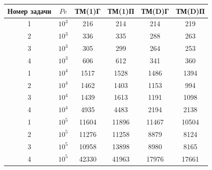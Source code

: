 {\hfill


{\begin{tabular}{|c|c|c|c|c|c|} 


\hline 


Номер задачи & $Pe$ & ТМ(1)Г & ТМ(1)П & ТМ(D)Г & ТМ(D)П\\ 


\hline 


1  &  $10^3$  &  216 &      214 &      214  &     219 \\ 


\hline 


2 &   $10^3$ &   336 &     335 &      288 &     263 \\ 


\hline 


3 &   $10^3$ &   305 &     299 &     264 &     253 \\ 


\hline 


4 &   $10^3$  &  606 &     612 &      341 &     360 \\ 


\hline 


1 &   $10^4$  &  1517 &    1528 &    1486 &    1394 \\ 


\hline 


2 &   $10^4$ &   1462 &    1403 &    1153 &   994 \\ 


\hline 


3 &   $10^4$ &   1439  &   1613  &   1191 &    1098 \\ 


\hline 


4 &   $10^4$ &   4935 &    4483 &    2194 &    2138 \\ 


\hline 


1 &   $10^5$ &   11604 &   11896  &  11467 &   10504 \\ 


\hline 


2 &   $10^5$ &   11276 &   11258 &   8879 &    8124 \\ 


\hline 


3 &   $10^5$ &   10958 &   13898 &   8980 &    8165 \\ 


\hline 


4 &   $10^5$ &   42330 &   41963 &   17976 &   17661 \\ 


\hline 


\end{tabular} 


}


\hfill}


